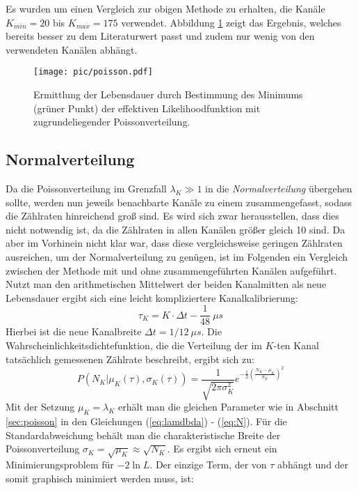 		Es wurden um einen Vergleich zur obigen Methode zu erhalten, die Kanäle $K_{min} = 20$ bis $K_{max} = 175$ verwendet. Abbildung \ref{fig:LDpoisson} zeigt das Ergebnis, welches bereits besser zu dem Literaturwert passt und zudem nur wenig von den verwendeten Kanälen abhängt.
		\begin{figure}[ht]
		      			\centering
		      			\captionsetup{justification=centering}
		      			\texttt{[image: pic/poisson.pdf]}
		      			\caption{Ermittlung der Lebensdauer durch Bestimmung des Minimums (grüner Punkt) der effektiven Likelihoodfunktion mit zugrundeliegender Poissonverteilung.}
		      			\label{fig:LDpoisson}
		\end{figure}
   \subsection{Normalverteilung}	
   Da die Poissonverteilung im Grenzfall $\lambda_K \gg 1$ in die \textit{Normalverteilung} übergehen sollte, werden nun jeweils benachbarte Kanäle zu einem zusammengefasst, sodass die Zählraten hinreichend groß sind. Es wird sich zwar herausstellen, dass dies nicht notwendig ist, da die Zählraten in allen Kanälen größer gleich 10 sind. Da aber im Vorhinein nicht klar war, dass diese vergleichsweise geringen Zählraten ausreichen, um der Normalverteilung zu genügen, ist im Folgenden ein Vergleich zwischen der Methode mit und ohne zusammengeführten Kanälen aufgeführt. Nutzt man den arithmetischen Mittelwert der beiden Kanalmitten als neue Lebensdauer ergibt sich eine leicht kompliziertere Kanalkalibrierung:
   		\begin{equation}
   				\tau_K = K \cdot \Delta t - \frac{1}{48}\ \unit{\mu s}	
   		\end{equation} 
   Hierbei ist die neue Kanalbreite $\Delta t = 1/12\ \unit{\mu s}$. Die Wahrscheinlichkeitsdichtefunktion, die die Verteilung der im $K$-ten Kanal tatsächlich gemessenen Zählrate beschreibt, ergibt sich zu:
   		\begin{equation}
      			P(N_K|\mu_K(\tau),\sigma_K(\tau)) = \frac{1}{\sqrt{2\pi\sigma_K^2}}e^{-\frac{1}{2}\left(\frac{N_K- \mu_K}{\sigma_K}\right)^2}	
      	\end{equation} 
    Mit der Setzung $\mu_K = \lambda_K$ erhält man die gleichen Parameter wie in Abschnitt \ref{sec:poisson} in den Gleichungen (\ref{eq:lamdbda}) - (\ref{eq:N}). Für die Standardabweichung behält man die charakteristische Breite der Poissonverteilung $\sigma_K = \sqrt{\mu_K} \approx\sqrt{N_K}$.
    Es ergibt sich erneut ein Minimierungsproblem für $-2\ln L$. Der einzige Term, der von $\tau$ abhängt und der somit graphisch minimiert werden muss, ist:
